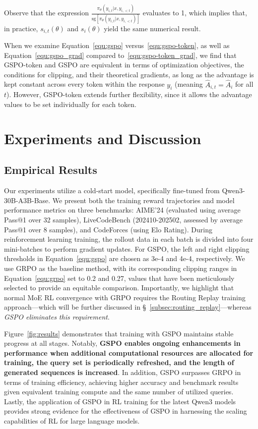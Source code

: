 Observe that the expression $\frac{ \pi_{\theta} (y_{i,t} | x, y_{i,<t}) }{ \mathrm{sg} \left[ \pi_{\theta} (y_{i,t} | x, y_{i,<t}) \right] }$ evaluates to 1, which implies that, in practice, $s_{i,t}(\theta)$ and $s_{i}(\theta)$ yield the same numerical result.

When we examine Equation~\eqref{equ:gspo} versus~\eqref{equ:gspo-token}, as well as Equation~\eqref{equ:gspo_grad} compared to~\eqref{equ:gspo-token_grad}, we find that GSPO-token and GSPO are equivalent in terms of optimization objectives, the conditions for clipping, and their theoretical gradients, as long as the advantage is kept constant across every token within the response $y_i$ (meaning $\widehat{A}_{i,t} = \widehat{A}_{i}$ for all $t$). However, GSPO-token extends further flexibility, since it allows the advantage values to be set individually for each token.

\section{Experiments and Discussion}

\subsection{Empirical Results}

Our experiments utilize a cold-start model, specifically fine-tuned from Qwen3-30B-A3B-Base. We present both the training reward trajectories and model performance metrics on three benchmarks: AIME'24 (evaluated using average Pass@1 over 32 samples), LiveCodeBench (202410-202502, assessed by average Pass@1 over 8 samples), and CodeForces (using Elo Rating). During reinforcement learning training, the rollout data in each batch is divided into four mini-batches to perform gradient updates. For GSPO, the left and right clipping thresholds in Equation~\eqref{equ:gspo} are chosen as 3e-4 and 4e-4, respectively. We use GRPO as the baseline method, with its corresponding clipping ranges in Equation~\eqref{equ:grpo} set to 0.2 and 0.27, values that have been meticulously selected to provide an equitable comparison. Importantly, we highlight that normal MoE RL convergence with GRPO requires the Routing Replay training approach—which will be further discussed in \S~\ref{subsec:routing_replay}—whereas \textit{GSPO eliminates this requirement}.

Figure~\ref{fig:results} demonstrates that training with GSPO maintains stable progress at all stages. Notably, \textbf{GSPO enables ongoing enhancements in performance when additional computational resources are allocated for training, the query set is periodically refreshed, and the length of generated sequences is increased}. In addition, GSPO surpasses GRPO in terms of training efficiency, achieving higher accuracy and benchmark results given equivalent training compute and the same number of utilized queries. Lastly, the application of GSPO in RL training for the latest Qwen3 models provides strong evidence for the effectiveness of GSPO in harnessing the scaling capabilities of RL for large language models.

